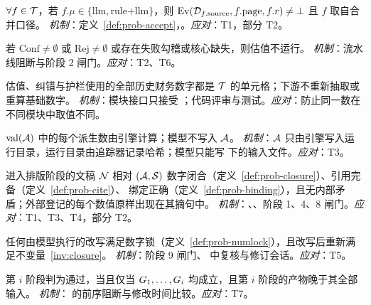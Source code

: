 \begin{invariant}[证据]
\label{inv:evidence}
$\forall f\in\mathcal{T}$，若 $f.\mu\in\{\text{llm},\text{rule+llm}\}$，则 $\operatorname{Ev}(\mathcal{D}_{f.\text{source}},f.\text{page},f.r)\neq\bot$ 且 $f$ 取自合并口径。
\emph{机制}：定义~\ref{def:prob-accept}，。\emph{应对}：T1，部分 T2。
\end{invariant}

\begin{invariant}[不静默取舍]
\label{inv:noselect}
若 $\mathrm{Conf}\neq\emptyset$ 或 $\mathrm{Rej}\neq\emptyset$ 或存在失败勾稽或核心缺失，则估值不运行。
\emph{机制}：流水线阻断与阶段 2 闸门。\emph{应对}：T2、T6。
\end{invariant}

\begin{invariant}[单一真值]
\label{inv:single}
估值、纠错与护栏使用的全部历史财务数字都是 $\mathcal{T}$ 的单元格；下游不重新抽取或重算基础数字。
\emph{机制}：模块接口只接受 ；代码评审与测试。\emph{应对}：防止同一数在不同模块中取值不同。
\end{invariant}

\begin{invariant}[计算外置]
\label{inv:compute}
$\operatorname{val}(\mathcal{A})$ 中的每个派生数由引擎计算；模型不写入 $\mathcal{A}$。
\emph{机制}：$\mathcal{A}$ 只由引擎写入运行目录，运行目录由追踪器记录哈希；模型只能写  下的输入文件。\emph{应对}：T3。
\end{invariant}

\begin{invariant}[数字闭合与引用完备]
\label{inv:closure}
进入排版阶段的文稿 $\mathcal{N}$ 相对 $(\mathcal{A},\mathcal{S})$ 数字闭合（定义~\ref{def:prob-closure}）、引用完备（定义~\ref{def:prob-cite}）、
绑定正确（定义~\ref{def:prob-binding}），且无内部矛盾；外部登记的每个数值原样出现在其摘句中。
\emph{机制}：、、阶段 1、4、8 闸门。\emph{应对}：T1、T3、T4，部分 T2。
\end{invariant}

\begin{invariant}[改写不增数]
\label{inv:numlock}
任何由模型执行的改写满足数字锁（定义~\ref{def:prob-numlock}），且改写后重新满足不变量~\ref{inv:closure}。
\emph{机制}：阶段 9 闸门、 中复核与修订会话。\emph{应对}：T5。
\end{invariant}

\begin{invariant}[阶段单调与新鲜]
\label{inv:gates}
第 $i$ 阶段判为通过，当且仅当 $G_1,\dots,G_i$ 均成立，且第 $i$ 阶段的产物晚于其全部输入。
\emph{机制}： 的前序阻断与修改时间比较。\emph{应对}：T7。
\end{invariant}

